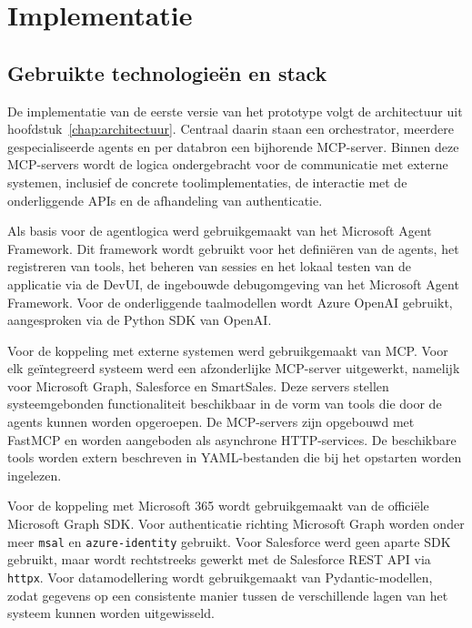 \chapter{Implementatie}
\label{chap:implementatie}

\section{Gebruikte technologieën en stack}
\label{sec:stack}

De implementatie van de eerste versie van het prototype volgt de architectuur uit hoofdstuk~\ref{chap:architectuur}. Centraal daarin staan een orchestrator, meerdere gespecialiseerde agents en per databron een bijhorende \gls{MCP}-server. Binnen deze \gls{MCP}-servers wordt de logica ondergebracht voor de communicatie met externe systemen, inclusief de concrete toolimplementaties, de interactie met de onderliggende \glspl{API} en de afhandeling van authenticatie.

Als basis voor de agentlogica werd gebruikgemaakt van het Microsoft Agent Framework. Dit framework wordt gebruikt voor het definiëren van de agents, het registreren van tools, het beheren van sessies en het lokaal testen van de applicatie via de DevUI, de ingebouwde debugomgeving van het Microsoft Agent Framework. Voor de onderliggende taalmodellen wordt Azure OpenAI gebruikt, aangesproken via de Python \gls{SDK} van OpenAI.

Voor de koppeling met externe systemen werd gebruikgemaakt van \gls{MCP}. Voor elk geïntegreerd systeem werd een afzonderlijke \gls{MCP}-server uitgewerkt, namelijk voor Microsoft Graph, Salesforce en SmartSales. Deze servers stellen systeemgebonden functionaliteit beschikbaar in de vorm van tools die door de agents kunnen worden opgeroepen. De \gls{MCP}-servers zijn opgebouwd met FastMCP en worden aangeboden als asynchrone HTTP-services. De beschikbare tools worden extern beschreven in YAML-bestanden die bij het opstarten worden ingelezen.

Voor de koppeling met Microsoft 365 wordt gebruikgemaakt van de officiële Microsoft Graph \gls{SDK}. Voor authenticatie richting Microsoft Graph worden onder meer \texttt{msal} en \texttt{azure-identity} gebruikt. Voor Salesforce werd geen aparte \gls{SDK} gebruikt, maar wordt rechtstreeks gewerkt met de Salesforce \gls{REST} \gls{API} via \texttt{httpx}. Voor datamodellering wordt gebruikgemaakt van Pydantic-modellen, zodat gegevens op een consistente manier tussen de verschillende lagen van het systeem kunnen worden uitgewisseld.

